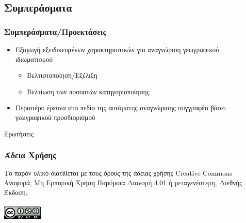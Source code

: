 \documentclass{beamer}
\begin{document}
\begin{frame}
	\section{Συμπεράσματα}
	\frametitle{Συμπεράσματα/Προεκτάσεις}
	\begin{itemize}
		\item Εξαγωγή εξειδικευμένων χαρακτηριστικών για αναγνώριση γεωγραφικού ιδιωματισμού
		\begin{itemize}
			\item Βελτιστοποίηση/Εξέλιξη
			\item Βελτίωση των ποσοστών κατηγοριοποίησης\linebreak
		\end{itemize}

		\item Περαιτέρο έρευνα στο πεδίο της αυτόματης αναγνώρισης συγγραφέα βάσει γεωγραφικού προσδιορισμού
	\end{itemize}
	

\end{frame}
\begin{frame}
	\huge Ερωτήσεις
	
\end{frame}
\begin{frame}
	\frametitle{Άδεια Χρήσης}
	Το παρόν υλικό διατίθεται με τους όρους της άδειας χρήσης Creative Commons Αναφορά, Μη Εμπορική Χρήση Παρόμοια Διανομή 4.01 ή μεταγενέστερη, Διεθνής Έκδοση.\\~\\
	\includegraphics[width=2cm,keepaspectratio]{img/cc_logo}
\end{frame}
\end{document}
